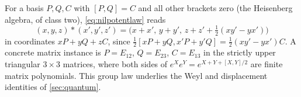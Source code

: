 For a basis $P,Q,C$ with $[P,Q]=C$ and all other brackets zero (the
Heisenberg algebra, of class two), \eqref{eq:nilpotentlaw} reads
\begin{equation}\label{eq:heisenberglaw}
 (x,y,z)*(x',y',z')=\bigl(x+x',\,y+y',\,z+z'+\tfrac12(xy'-yx')\bigr)
\end{equation}
in coordinates $xP+yQ+zC$, since $\frac12[xP+yQ,x'P+y'Q]=\frac12(xy'-yx')C$.
A concrete matrix instance is $P=E_{12}$, $Q=E_{23}$, $C=E_{13}$ in the
strictly upper triangular $3\times3$ matrices, where both sides of
$e^Xe^Y=e^{X+Y+[X,Y]/2}$ are finite matrix polynomials. This group law
underlies the Weyl and displacement identities of \cref{sec:quantum}.
